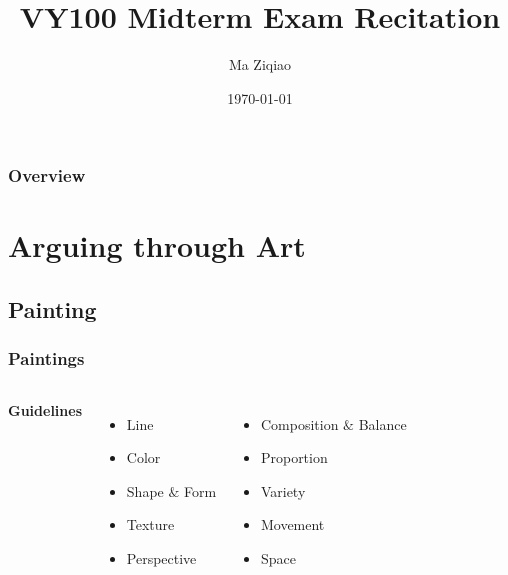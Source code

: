 \documentclass{beamer}
\title[Midterm RC]{VY100 Midterm Exam Recitation} %
\author{Ma Ziqiao} %
\institute[UM-SJTU JI] %
{
UM-SJTU Joint Institute \\ %
\medskip
\textit{martin\underline{ }maziqiao@sjtu.edu.com} %
}
\date{\today} %
\begin{document}
\begin{frame}
\titlepage %
\end{frame}

\begin{frame}
\frametitle{Overview} %
\tableofcontents %
\end{frame}


\section{Arguing through Art} 
\subsection{Painting} 
\begin{frame}
\frametitle{Paintings}
\begin{columns}[c] %

\textbf{Guidelines}
\begin{itemize}
\item Line
\item Color
\item Shape $\&$ Form
\item Texture
\item Perspective
\end{itemize}

\begin{itemize}
\item Composition $\&$ Balance
\item Proportion
\item Variety
\item Movement
\item Space
\end{itemize}

\end{columns}
\end{frame}
\end{document}
